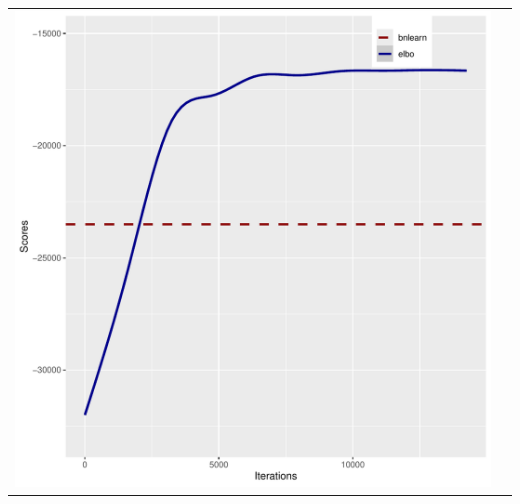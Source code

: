 \documentclass[]{scrartcl}
\begin{document}
\begin{tabular}{cc}
\includegraphics[scale = 0.4]{./figs/win95pts/mapEvolution-5-14252.pdf} &  \\
\end{tabular}
\end{document}
